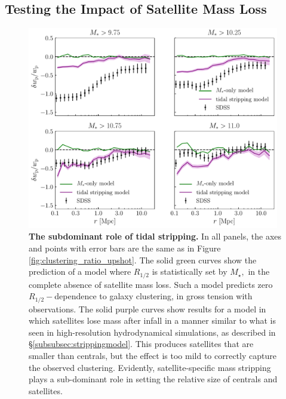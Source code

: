 \documentclass[usenatbib,usegraphicx,letterpaper]{mn2e}
\newcommand{\rhalf}{R_{1/2}}
\newcommand{\mstar}{M_{\star}}
\begin{document}
\subsection{Testing the Impact of Satellite Mass Loss}
\label{subsec:mstar_stripping}
\begin{figure}
\centering
\includegraphics[width=11cm]{FIGS/alt_model_wp_ratios.pdf}
\caption{
{\bf The subdominant role of tidal stripping.}
In all panels, the axes and points with error bars are the same as in Figure \ref{fig:clustering_ratio_upshot}. The solid green curves show the prediction of a model where $\rhalf$ is statistically set by $\mstar,$ in the complete absence of satellite mass loss. Such a model predicts zero $\rhalf-$dependence to galaxy clustering, in gross tension with observations. The solid purple curves show results for a model in which satellites lose mass after infall in a manner similar to what is seen in high-resolution hydrodynamical simulations, as described in \S\ref{subsubsec:strippingmodel}. This produces satellites that are smaller than centrals, but the effect is too mild to correctly capture the observed clustering. Evidently, satellite-specific mass stripping plays a sub-dominant role in setting the relative size of centrals and satellites.
}
\label{fig:mstarmodelclustering}
\end{figure}
\end{document}
